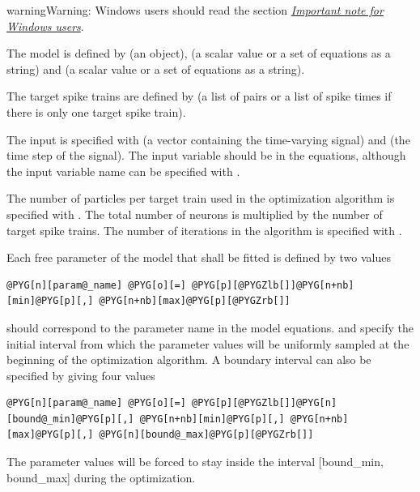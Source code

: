 \documentclass[letterpaper,10pt,english]{manual}
\begin{document}
\begin{notice}{warning}{Warning:}
Windows users should read the section \hyperlink{note-for-windows-users}{\emph{Important note for Windows users}}.
\end{notice}

The model is defined by  (an \hyperlink{brian.Equations}{} object),
 (a scalar value or a set of equations as a string) and
 (a scalar value or a set of equations as a string).

The target spike trains are defined by  (a list of pairs 
or a list of spike times if there is only one target spike train).

The input is specified with  (a vector containing the time-varying signal)
and  (the time step of the signal).
The input variable should be  in the equations, although the input variable name
can be specified with .

The number of particles per target train used in the optimization algorithm is
specified with . The total number of neurons is   multiplied
by the number of target spike trains.
The number of iterations in the algorithm is specified with .

Each free parameter of the model that shall be fitted is defined by two values

\begin{Verbatim}[commandchars=@\[\]]
@PYG[n][param@_name] @PYG[o][=] @PYG[p][@PYGZlb[]]@PYG[n+nb][min]@PYG[p][,] @PYG[n+nb][max]@PYG[p][@PYGZrb[]]
\end{Verbatim}

 should correspond to the parameter name in the model equations.
 and  specify the initial interval from which the parameter values
will be uniformly sampled at the beginning of the optimization algorithm.
A boundary interval can also be specified by giving four values

\begin{Verbatim}[commandchars=@\[\]]
@PYG[n][param@_name] @PYG[o][=] @PYG[p][@PYGZlb[]]@PYG[n][bound@_min]@PYG[p][,] @PYG[n+nb][min]@PYG[p][,] @PYG[n+nb][max]@PYG[p][,] @PYG[n][bound@_max]@PYG[p][@PYGZrb[]]
\end{Verbatim}

The parameter values will be forced to stay inside the interval {[}bound\_min, bound\_max{]}
during the optimization.
\end{document}
